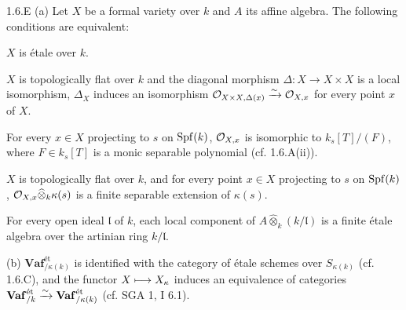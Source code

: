 \begin{proposition}{1.6.E}\label{VIIB.1.6.E}
(a) Let $X$ be a formal variety over $k$ and $A$ its affine algebra. The following conditions are equivalent:
\begin{enumeratei}
\item $X$ is étale over $k$.
\item $X$ is topologically flat over $k$ and the diagonal morphism $\Delta:X\to X\times X$ is a local isomorphism, \ie $\Delta_X$ induces an isomorphism $\mathcal{O}_{X\times X,\Delta(x)}\xrightarrow{\sim}\mathcal{O}_{X,x}$ for every point $x$ of $X$.
\item For every $x\in X$ projecting to $s$ on $\operatorname{Spf}(k)$, $\mathcal{O}_{X,x}$ is isomorphic to $k_s[T]/(F)$, where $F\in k_s[T]$ is a monic separable polynomial (cf. 1.6.A(ii)).
\item $X$ is topologically flat over $k$, and for every point $x\in X$ projecting to $s$ on $\operatorname{Spf}(k)$, $\mathcal{O}_{X,x}\widehat\otimes_k\kappa(s)$ is a finite separable extension of $\kappa(s)$.
\item For every open ideal $\mathfrak l$ of $k$, each local component of $A\widehat\otimes_k(k/\mathfrak l)$ is a finite étale algebra over the artinian ring $k/\mathfrak l$.
\end{enumeratei}
(b) $\mathbf{Vaf}_{/\kappa(k)}^{\text{ét}}$ is identified with the category of étale schemes over $S_{\kappa(k)}$ (cf. 1.6.C), and the functor $X\longmapsto X_\kappa$ induces an equivalence of categories $\mathbf{Vaf}_{/k}^{\text{ét}}\xrightarrow{\sim}\mathbf{Vaf}_{/\kappa(k)}^{\text{ét}}$ (cf. SGA 1, I 6.1).
\end{proposition}
